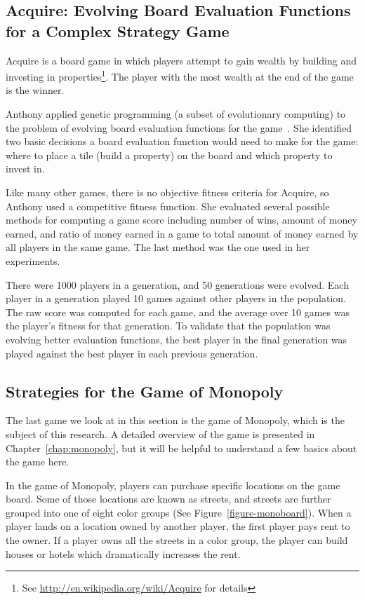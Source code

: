 \subsection{Acquire: Evolving Board Evaluation Functions for a Complex Strategy
Game}

Acquire is a board game in which players attempt to gain wealth by building and
investing in properties\footnote{See \url{http://en.wikipedia.org/wiki/Acquire}
for details}. The player with the most wealth at the end of the game is the
winner.

Anthony applied genetic programming (a subset of evolutionary computing) to the
problem of evolving board evaluation functions for the game~\cite{Anthony2002}.
She identified two basic decisions a board evaluation function would need to
make for the game: where to place a tile (build a property) on the board and
which property to invest in. 

Like many other games, there is no objective fitness criteria for Acquire, so
Anthony used a competitive fitness function. She evaluated several possible
methods for computing a game score including number of wins, amount of money
earned, and ratio of money earned in a game to total amount of money earned by
all players in the same game. The last method was the one used in her
experiments.

There were 1000 players in a generation, and 50 generations were evolved. Each
player in a generation played 10 games against other players in the population.
The raw score was computed for each game, and the average over 10 games was the
player's fitness for that generation. To validate that the population was
evolving better evaluation functions, the best player in the final generation
was played against the best player in each previous generation.

\subsection{Strategies for the Game of Monopoly}

The last game we look at in this section is the game of Monopoly, which is the
subject of this research. A detailed overview of the game is presented in
Chapter~\ref{chap:monopoly}, but it will be helpful to understand a few basics
about the game here. 

In the game of Monopoly, players can purchase specific locations on the game
board. Some of those locations are known as streets, and streets are further
grouped into one of eight color groups (See Figure~\ref{figure-monoboard}). When
a player lands on a location owned by another player, the first player pays rent
to the owner. If a player owns all the streets in a color group, the player can
build houses or hotels which dramatically increases the rent.

